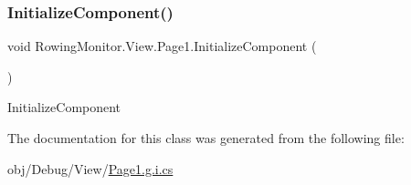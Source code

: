 \subsubsection{\texorpdfstring{Initialize\+Component()}{InitializeComponent()}}
{\footnotesize\ttfamily void Rowing\+Monitor.\+View.\+Page1.\+Initialize\+Component (\begin{DoxyParamCaption}{ }\end{DoxyParamCaption})}



Initialize\+Component 



The documentation for this class was generated from the following file\+:\begin{DoxyCompactItemize}
\item 
obj/\+Debug/\+View/\hyperlink{_page1_8g_8i_8cs}{Page1.\+g.\+i.\+cs}\end{DoxyCompactItemize}
